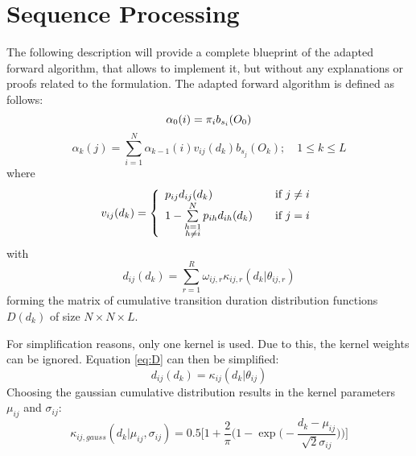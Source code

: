 \documentclass[mscthesis]{usiinfthesis}
\begin{document}
\section{Sequence Processing}

The following description will provide a complete blueprint of the adapted
forward algorithm, that allows to implement it, but without any explanations or
proofs related to the formulation. The adapted forward algorithm is defined as
follows:
\begin{equation}
    \label{eq:forward_init}
    \alpha_0(i) = \pi_{i}b_{s_i}(O_0) \\
\end{equation}
\begin{equation}
    \label{eq:forward}
    \alpha_k(j) = \sum_{i=1}^{N} \alpha_{k-1}(i) v_{ij}(d_k) b_{s_j}(O_k);
    \quad 1 \leq k \leq L
\end{equation}
where
\begin{equation}
    \label{eq:V}
    v_{ij}(d_k) = \left\{
        \begin{array}{l l}
            p_{ij} d_{ij}(d_k)
                & \quad \text{if $j \neq i$}\\
            1 - \sum\limits_{\substack{h=1 \\ h \neq i}}^{N} p_{ih} d_{ih}(d_k)
                & \quad \text{if $j = i$}
        \end{array} \right.
\end{equation}
with
\begin{equation}
    \label{eq:D}
    d_{ij}(d_k) = \sum_{r=1}^{R} \omega_{ij,r}\kappa_{ij,r}(d_k|\theta_{ij, r})
\end{equation}
forming the matrix of cumulative transition duration distribution functions
$ D(d_k) $ of size $ N \times N \times L $.

For simplification reasons, only one kernel is used. Due to this, the kernel
weights can be ignored. Equation \ref{eq:D} can then be simplified:
\begin{equation}
    \label{eq:D_fact}
    d_{ij}(d_k) = \kappa_{ij}(d_k | \theta_{ij})
\end{equation}
Choosing the gaussian cumulative distribution results in the kernel parameters
$ \mu_{ij} $ and $ \sigma_{ij} $:
\begin{equation}
    \label{eq:kernel}
    \kappa_{ij, gauss}(d_k | \mu_{ij}, \sigma_{ij}) = 
        0.5\bigg [1 + \frac{2}{\pi}\Big (
            1 - \exp \big (-\frac{d_k - \mu_{ij}}{\sqrt 2 \sigma_{ij}}\big )
        \Big ) \bigg ]
\end{equation}
\end{document}
